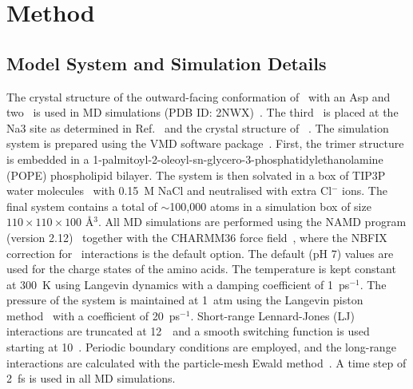 \section{Method}
\label{bind:method}
\subsection{Model System and Simulation Details}
The crystal structure of the outward-facing conformation of \GltPh\ with an Asp and two \Na\ is used 
in MD simulations (PDB ID: 2NWX)~\cite{Boudker2007}. The third \Na\ is placed at the Na3 site
as determined in Ref.~\cite{Bastug2012} and the crystal structure of \GltTk~\cite{Guskov2016}. 
The simulation system is prepared using the  VMD software package~\cite{Humphrey1996}. First, the 
trimer structure is embedded in a 1-palmitoyl-2-oleoyl-sn-glycero-3-phosphatidylethanolamine (POPE) 
phospholipid bilayer. The system is then solvated in a box of TIP3P water molecules~\cite{Jorgensen1983,Neria1996} 
with 0.15~M NaCl and neutralised with extra Cl$^-$ ions. The final system contains a total of 
$\sim$100,000 atoms in a simulation box of size $110 \times 110 \times 100$ \AA$^3$. All MD simulations 
are performed using the NAMD program (version 2.12)~\cite{Phillips2005} together with the CHARMM36 force 
field~\cite{Klauda2012}, where the NBFIX correction for \Na\ interactions is the default option. The 
default (pH 7) values are used for the charge states of the amino acids. The temperature is kept constant 
at 300~K using Langevin dynamics with a damping coefficient of 1~ps$^{-1}$. The pressure of the system is 
maintained at 1~atm using the Langevin piston method~\cite{Feller1996} with a coefficient of 20~ps$^{-1}$. 
Short-range Lennard-Jones (LJ) interactions are truncated at 12~\angs\ and a smooth switching function is 
used starting at 10~\angs. Periodic boundary conditions are employed, and the long-range interactions are 
calculated with the particle-mesh Ewald method~\cite{Darden1993}. A time step of 2~fs is used in all MD 
simulations.

